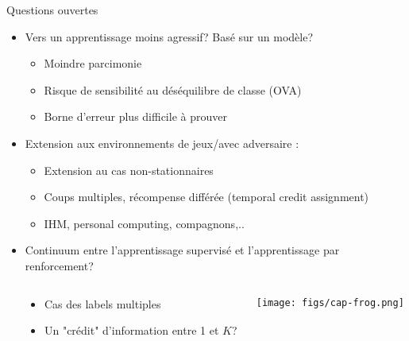 \documentclass{beamer}
\begin{document}
\begin{frame}{Questions ouvertes}
	\begin{itemize}
		\item Vers un apprentissage moins agressif? Basé sur un modèle?
		\begin{itemize}
			\item Moindre parcimonie
			\item Risque de sensibilité au déséquilibre de classe (OVA)
			\item Borne d'erreur plus difficile à prouver
		\end{itemize}  
		\item Extension aux environnements de jeux/avec adversaire :
		\begin{itemize}
			\item Extension au cas non-stationnaires \cite{kivinen2004online} 
			\item Coups multiples, récompense différée (temporal credit assignment) \cite{sutton1998reinforcement}
			\item IHM, personal computing, compagnons,..
		\end{itemize}  		
		\item Continuum entre l'apprentissage supervisé et l'apprentissage par renforcement?
	\end{itemize}
	\vspace{-.7cm}
	\begin{columns}[t]
		\begin{column}{.01\linewidth}
		\end{column}
		\begin{column}{.4\linewidth}
			\begin{small}
			\begin{itemize}
				\item Cas des labels multiples
				\item Un "crédit" d'information entre 1 et $K$?
			\end{itemize} 
			\end{small}
		\end{column}
		\begin{column}{.4\linewidth}
			\begin{block}{}
				\centerline{\texttt{[image: figs/cap-frog.png]}}
			\end{block}
		\end{column}
	\end{columns}
	

		
\end{frame}



\end{document}
